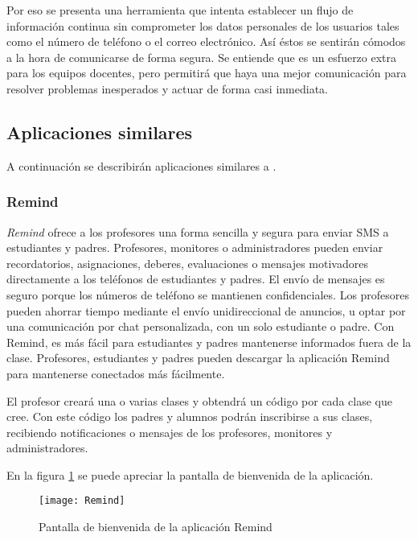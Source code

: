 		\bigskip
		Por eso se presenta una herramienta que intenta establecer un flujo de información continua sin comprometer los datos personales de los usuarios tales como el número de teléfono o el correo electrónico. Así éstos se sentirán cómodos a la hora de comunicarse de forma segura. Se entiende que es un esfuerzo extra para los equipos docentes, pero permitirá que haya una mejor comunicación para resolver problemas inesperados y actuar de forma casi inmediata.
		
		\subsection{Aplicaciones similares}
		
		A continuación se describirán aplicaciones similares a \CollegeApp.
		
		\subsubsection{Remind}
		{\it Remind} \cite{3:remind:online} ofrece a los profesores una forma sencilla y segura para enviar SMS a estudiantes y padres. Profesores, monitores o administradores pueden enviar recordatorios, asignaciones, deberes, evaluaciones o mensajes motivadores directamente a los teléfonos de estudiantes y padres. El envío de mensajes es seguro porque los números de teléfono se mantienen confidenciales. Los profesores pueden ahorrar tiempo mediante el envío unidireccional de anuncios, u optar por una comunicación por chat personalizada, con un solo estudiante o padre. Con Remind, es más fácil para estudiantes y padres mantenerse informados fuera de la clase.
		Profesores, estudiantes y padres pueden descargar la aplicación Remind para mantenerse conectados más fácilmente.
		
		\bigskip
		El profesor creará una o varias clases y obtendrá un código por cada clase que cree. Con este código los padres y alumnos podrán inscribirse a sus clases, recibiendo notificaciones o mensajes de los profesores, monitores y administradores. 
		
		En la figura \ref{fig:Remind} se puede apreciar la pantalla de bienvenida de la aplicación.
		
		\begin{figure}[h !]
			\centering
			\texttt{[image: Remind]}
			\caption{Pantalla de bienvenida de la aplicación Remind}
			\label{fig:Remind}
		\end{figure}
		
